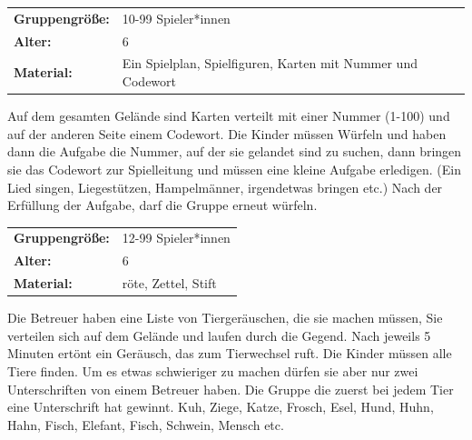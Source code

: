 \begin{table}[H]
\begin{tabular}{>{\bfseries}lp{8cm}}
   Gruppengröße:   & 10-99 Spieler*innen\\
    Alter: & 6 \\
    Material: & Ein Spielplan, Spielfiguren, Karten mit Nummer und Codewort \\
\end{tabular}
\end{table} 

Auf dem gesamten Gelände sind Karten verteilt mit einer Nummer (1-100) und auf der anderen Seite einem Codewort. Die Kinder müssen Würfeln und haben dann die Aufgabe die Nummer, auf der sie gelandet sind zu suchen, dann bringen sie das Codewort zur Spielleitung und müssen eine kleine Aufgabe erledigen. (Ein Lied singen, Liegestützen, Hampelmänner, irgendetwas bringen etc.) Nach der Erfüllung der Aufgabe, darf die Gruppe erneut würfeln. \\



\begin{table}[H]
\begin{tabular}{>{\bfseries}lp{8cm}}
   Gruppengröße:   & 12-99 Spieler*innen\\
    Alter: & 6 \\
    Material: & röte, Zettel, Stift \\
\end{tabular}
\end{table} 

 Die Betreuer haben eine Liste von Tiergeräuschen, die sie machen müssen, Sie verteilen sich auf dem Gelände und laufen durch die Gegend.  Nach jeweils 5 Minuten ertönt ein Geräusch, das zum Tierwechsel ruft. Die Kinder müssen alle Tiere finden. Um es etwas schwieriger zu machen dürfen sie aber nur zwei Unterschriften von einem Betreuer haben. Die Gruppe die zuerst bei jedem Tier eine Unterschrift hat gewinnt. Kuh, Ziege, Katze, Frosch, Esel, Hund, Huhn, Hahn, Fisch, Elefant, Fisch, Schwein, Mensch etc. \\

